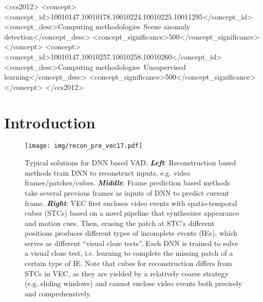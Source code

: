 \documentclass[sigconf]{acmart}
\begin{document}
\begin{CCSXML}
	<ccs2012>
	<concept>
	<concept_id>10010147.10010178.10010224.10010225.10011295</concept_id>
	<concept_desc>Computing methodologies~Scene anomaly detection</concept_desc>
	<concept_significance>500</concept_significance>
	</concept>
	<concept>
	<concept_id>10010147.10010257.10010258.10010260</concept_id>
	<concept_desc>Computing methodologies~Unsupervised learning</concept_desc>
	<concept_significance>500</concept_significance>
	</concept>
	</ccs2012>
\end{CCSXML}




\maketitle

\section{Introduction}
\label{sec:intro}

\begin{figure*}
	\centering
	\texttt{[image: img/recon\_pre\_vec17.pdf]}
	\caption{Typical solutions for DNN based VAD. \textbf{\textit{Left}}: Reconstruction based methods train DNN to reconstruct inputs, e.g. video frames/patches/cubes. \textbf{\textit{Middle}}: Frame prediction based methods take several previous frames as inputs of DNN to predict current frame. \textbf{\textit{Right}}: VEC first encloses video events with spatio-temporal cubes (STCs) based on a novel pipeline that synthesizes appearance and motion cues. Then, erasing the patch at STC's different positions produces different types of incomplete events (IEs), which serves as different ``visual cloze tests''. Each DNN is trained to solve a visual cloze test, i.e. learning to complete the missing patch of a certain type of IE. Note that cubes for reconstruction differs from STCs in VEC, as they are yielded by a relatively coarse strategy (e.g. sliding windows) and cannot enclose video events both precisely and comprehensively.}
	\label{fig:recon_pre_vec}
\end{figure*}
\end{document}

